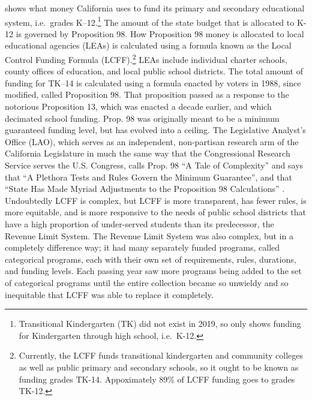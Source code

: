  shows what money California uses to fund its primary and secondary educational system, i.e.~grades K–12.\footnote{Transitional Kindergarten (TK) did not exist in 2019, so  only shows funding  for Kindergarten through high school, i.e.~K-12.} The amount of the state budget that is allocated to K-12 is governed by Proposition 98. How Proposition 98 money is allocated to local educational agencies (LEAs) is calculated using a formula known as the Local Control Funding Formula (LCFF).\footnote{Currently, the LCFF funds transitional kindergarten and community colleges as well as public primary and secondary schools, so it ought to be known as funding grades TK-14. Appoximately 89\% of LCFF funding goes to grades TK-12.} LEAs include individual charter schools, county offices of education, and local public school districts. The total amount of funding for TK–14 is calculated using a formula enacted by voters in 1988, since modified, called Proposition 98. That proposition passed as a response to the notorious Proposition 13, which was enacted a decade earlier, and which decimated school funding. Prop. 98 was originally meant to be a minimum guaranteed funding level, but has evolved into a ceiling. The Legislative Analyst's Office (LAO), which serves as an independent, non-partisan research arm of the California Legislature in much the same way that the Congressional Research Service serves the U.S. Congress, calls Prop. 98 ``A Tale of Complexity''  and says that ``A Plethora Tests and Rules Govern the Minimum Guarantee'', and that ``State Has Made Myriad Adjustments to the Proposition 98 Calculations'' \parencite[5]{LAO2017}.
Undoubtedly LCFF is complex, but LCFF is more transparent, has fewer rules, is more equitable, and is more responsive to the needs of public school districts that have a high proportion of under-served students than its predecessor, the Revenue Limit System. The Revenue Limit System was also complex, but in a completely difference way; it had many separately funded programs, called categorical programs, each with their own set of requirements, rules, durations, and funding levels. Each passing year saw more programs being added to the set of categorical programs until the entire collection became so unwieldy and so inequitable that LCFF was able to replace it completely.


